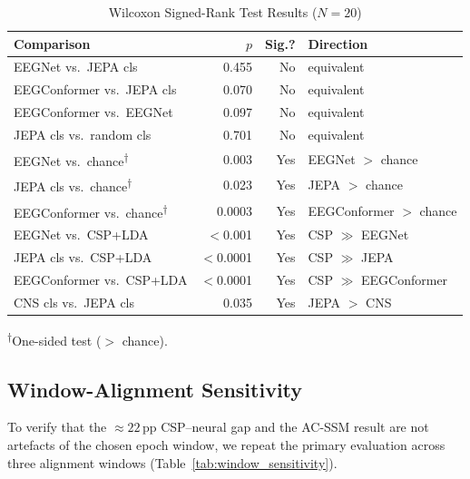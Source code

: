 \documentclass[journal]{IEEEtran}
\begin{document}
\begin{table}[t]
\centering
\caption{Wilcoxon Signed-Rank Test Results ($N=20$)}
\label{tab:wilcoxon}
{\renewcommand{\arraystretch}{0.88}%
\begin{tabular}{lrrl}
\toprule
\textbf{Comparison} & \textbf{$p$} & \textbf{Sig.?} & \textbf{Direction} \\
\midrule
EEGNet vs.\ JEPA cls & 0.455 & No & equivalent \\
EEGConformer vs.\ JEPA cls & 0.070 & No & equivalent \\
EEGConformer vs.\ EEGNet & 0.097 & No & equivalent \\
JEPA cls vs.\ random cls & 0.701 & No & equivalent \\
EEGNet vs.\ chance\textsuperscript{†} & 0.003 & Yes & EEGNet $>$ chance \\
JEPA cls vs.\ chance\textsuperscript{†} & 0.023 & Yes & JEPA $>$ chance \\
EEGConformer vs.\ chance\textsuperscript{†} & 0.0003 & Yes & EEGConformer $>$ chance \\
EEGNet vs.\ CSP+LDA & $<$0.001 & Yes & CSP $\gg$ EEGNet \\
JEPA cls vs.\ CSP+LDA & $<$0.0001 & Yes & CSP $\gg$ JEPA \\
EEGConformer vs.\ CSP+LDA & $<$0.0001 & Yes & CSP $\gg$ EEGConformer \\
CNS cls vs.\ JEPA cls & 0.035 & Yes & JEPA $>$ CNS \\
\bottomrule
\end{tabular}}%
\vspace{0.2em}
{\footnotesize \textsuperscript{†}One-sided test ($>$ chance).}
\end{table}

\subsection{Window-Alignment Sensitivity}
\label{sec:window_sensitivity}

To verify that the $\approx\!22$\,pp CSP--neural gap and the AC-SSM result are not artefacts of the chosen epoch window, we repeat the primary evaluation across three alignment windows (Table~\ref{tab:window_sensitivity}).
\end{document}
